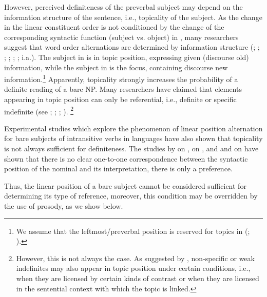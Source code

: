\documentclass[output=paper]{langscibook}
\begin{document}
    \largerpage[-2] %

However, perceived definiteness of the preverbal subject may depend on the information structure of the sentence, i.e., topicality of the subject. As the change in the linear constituent order is not conditioned by the change of the corresponding syntactic function (subject vs. object) in , many researchers suggest that word order alternations are determined by information structure (\citealt{Mathesius1964}; \citealt{Sgall1972}; \citealt{Hajicova1974}; \citealt{Isacenko1976}; \citealt{Yokoyama1987}; \citealt{Comrie1981}; i.a.). The subject in  is in topic position,  expressing given (discourse old) information, while the subject in  is the focus, containing discourse new information.\footnote{We assume that the leftmost/preverbal position is reserved for topics in  (\citealt{Geist2010}; \citealt{Jasinskaja2016}).} Apparently, topicality strongly increases the probability of a definite reading of a bare NP. Many researchers have claimed that elements appearing in topic position can only be referential, i.e., definite or specific indefinite (see \citealt{Reinhart1981}; \citealt{Erteschik-Shir1998}; \citealt{Portner.Yabushita2001}; \citealt{Endriss2009}).%
\footnote{However, this is not always the case. As suggested by \citet{Leonetti2010}, non-specific or weak indefinites may also appear in topic position under certain conditions, i.e., when they are licensed by certain kinds of contrast %
or when they are licensed in the sentential context with which the topic is linked.}

Experimental studies which explore the phenomenon of linear position alternation for bare subjects of intransitive verbs in  languages have also shown that topicality is not always sufficient for definiteness. The studies by \citet{Simik2014} on , \citet{Czardybon.etal2014} on , and \citet{Borik.etal2019} and \citet{Seres.etal2019} on  have shown that there is no clear one-to-one correspondence between the syntactic position of the nominal and its interpretation, there is only a preference.

Thus, the linear position of a bare subject %
cannot be considered sufficient for determining its type of reference, moreover, this condition may be overridden by the use of prosody, as we show below.
\end{document}
